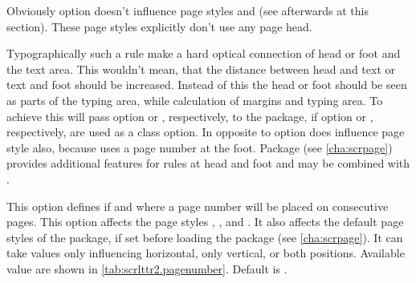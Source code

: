 Obviously option  doesn't influence page styles
 and  (see afterwards at this
section). These page styles explicitly don't use any page head.

Typographically such a rule make a hard optical connection of head
or foot and the text area. This wouldn't mean, that the distance between head
and text or text and foot should be increased. Instead of this the head or
foot should be seen as parts of the typing area, while calculation of margins
and typing area. To achieve this \KOMAScript{} will pass option
 or , respectively, to the
 package, if option  or
, respectively, are used as a class
option. In opposite to 
option  does influence page style  also,
because  uses a page number at the foot. Package
 (see
\autoref{cha:scrpage}) provides additional features for rules at head and foot
and may be combined with .%
%
%
%


\begin{Declaration}
\end{Declaration}
%
This option defines if and where a page number will be placed on
consecutive pages. This option affects the page
styles , , and
. It also affects the default page styles of the
 package, if set before
loading the package (see \autoref{cha:scrpage}). It can take values only
influencing horizontal, only vertical, or both positions. Available value are
shown in \autoref{tab:scrlttr2.pagenumber}. Default is .

